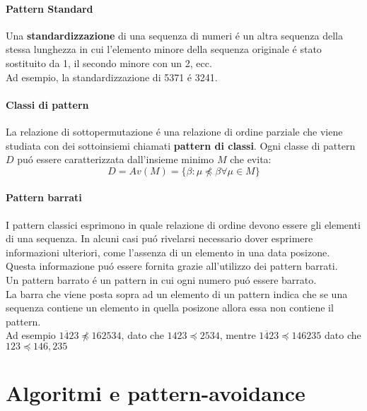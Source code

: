 \paragraph*{Pattern Standard}
Una \textbf{standardizzazione}\cite{claesson2012sorting} di una sequenza di numeri \'e un altra sequenza della stessa lunghezza in cui l'elemento minore della sequenza originale \'e stato sostituito da 1, il secondo minore con un 2, ecc.\\
Ad esempio, la standardizzazione di 5371 \'e 3241.
\paragraph*{Classi di pattern} La relazione di sottopermutazione \'e una relazione di ordine parziale che viene studiata con dei sottoinsiemi chiamati \textbf{pattern di classi}. Ogni classe di pattern $D$ pu\'o essere caratterizzata dall'insieme minimo $M$ che evita:$$ D = Av(M) = \{\beta:\mu\not\preceq\beta\forall\mu\in M\}$$
\paragraph*{Pattern barrati} I pattern classici esprimono in quale relazione di ordine devono essere gli elementi di una sequenza. In alcuni casi pu\'o rivelarsi necessario dover esprimere informazioni ulteriori, come l'assenza di un elemento in una data posizone. Questa informazione pu\'o essere fornita grazie all'utilizzo dei pattern barrati.\\
Un pattern barrato \'e un pattern in cui ogni numero pu\'o essere barrato.
\\La barra che viene posta sopra ad un elemento di un pattern indica che se una sequenza contiene un elemento in quella posizone allora essa non contiene il pattern.\\Ad esempio $1\overline{4}23\not\preceq 162534$, dato che $1423 \preceq 2534$, mentre $1\overline{4}23\preceq146235$ dato che $123\preceq146,235$
\section*{Algoritmi e pattern-avoidance}
